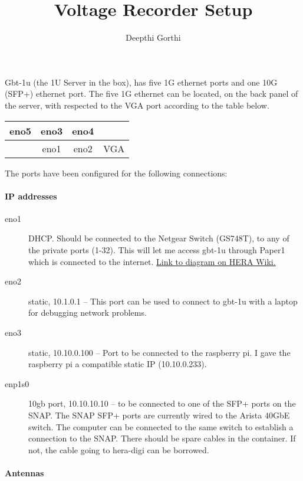 \documentclass[12pt,usletter,english]{article}
\begin{document}
\title{Voltage Recorder Setup} \author{Deepthi Gorthi} \maketitle

Gbt-1u (the 1U Server in the box), has five 1G ethernet ports and one
10G (SFP+) ethernet port. The five 1G ethernet can be located, on the
back panel of the server, with respected to the VGA port according to
the table below.

\begin{center}
  \begin{tabular}{| l | c | c | r |}
    \hline
    eno5 & eno3 & eno4 & \\
    \hline
    & eno1 & eno2 & VGA \\
    \hline
  \end{tabular}
\end{center}

The ports have been configured for the following connections:

\paragraph{IP addresses}
\begin{description}
\item[eno1] DHCP. Should be connected to the Netgear Switch (GS748T),
  to any of the private ports (1-32). This will let me access gbt-1u
  through Paper1 which is connected to the
  internet. \href{https://docs.google.com/presentation/d/1pqmiAIBzzXq71BUphQWKdoJBhLlbmE_w2vNg_Hh2KaE/edit#slide=id.p}{Link to diagram on HERA Wiki.}
\item[eno2] static, 10.1.0.1 -- This port can be used to connect to
  gbt-1u with a laptop for debugging network problems.
\item[eno3] static, 10.10.0.100 -- Port to be connected to the
  raspberry pi. I gave the raspberry pi a compatible static IP (10.10.0.233).
\item[enp1s0] 10gb port, 10.10.10.10 -- to be connected to one of the
  SFP+ ports on the SNAP. The SNAP SFP+ ports are currently wired to the
  Arista 40GbE switch. The computer can be connected to the same
  switch to establish a connection to the SNAP. There should be spare
  cables in the container. If not, the cable going to hera-digi can be
  borrowed.
\end{description}

\paragraph {Antennas}
\end{document}
